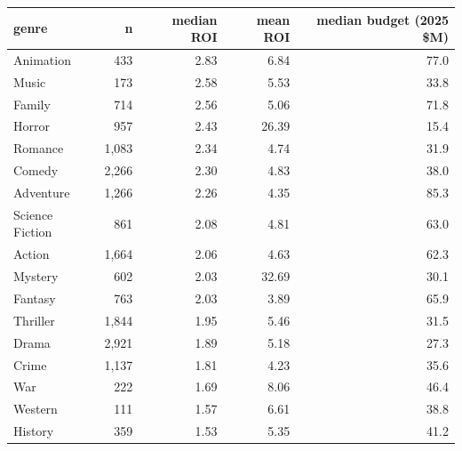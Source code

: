 \begin{tabular}{lrrrr}
\toprule
genre & n & median ROI & mean ROI & median budget (2025 \$M) \\
\midrule
Animation & 433 & 2.83 & 6.84 & 77.0 \\
Music & 173 & 2.58 & 5.53 & 33.8 \\
Family & 714 & 2.56 & 5.06 & 71.8 \\
Horror & 957 & 2.43 & 26.39 & 15.4 \\
Romance & 1{,}083 & 2.34 & 4.74 & 31.9 \\
Comedy & 2{,}266 & 2.30 & 4.83 & 38.0 \\
Adventure & 1{,}266 & 2.26 & 4.35 & 85.3 \\
Science Fiction & 861 & 2.08 & 4.81 & 63.0 \\
Action & 1{,}664 & 2.06 & 4.63 & 62.3 \\
Mystery & 602 & 2.03 & 32.69 & 30.1 \\
Fantasy & 763 & 2.03 & 3.89 & 65.9 \\
Thriller & 1{,}844 & 1.95 & 5.46 & 31.5 \\
Drama & 2{,}921 & 1.89 & 5.18 & 27.3 \\
Crime & 1{,}137 & 1.81 & 4.23 & 35.6 \\
War & 222 & 1.69 & 8.06 & 46.4 \\
Western & 111 & 1.57 & 6.61 & 38.8 \\
History & 359 & 1.53 & 5.35 & 41.2 \\
\bottomrule
\end{tabular}
